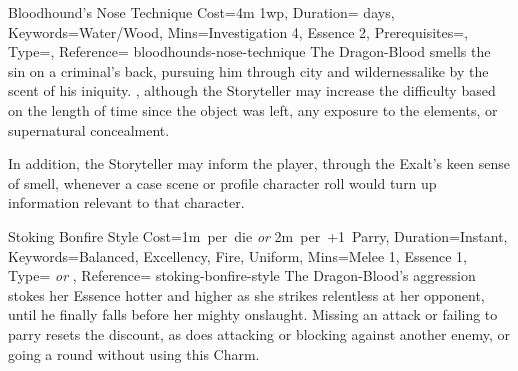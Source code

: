 \begin{Charm}{Bloodhound's Nose Technique}{%
    Cost=4m 1wp,
    Duration={ days},
    Keywords=Water/Wood,
    Mins={Investigation 4, Essence 2},
    Prerequisites=,
    Type=\SimpleType,
    Reference=\cite*[p.~199]{db}
}{bloodhounds-nose-technique}
    The Dragon-Blood smells the sin on a criminal's back, pursuing him through city
    and wildernessalike by the scent of his iniquity. , although the Storyteller may increase the difficulty based on
    the length of time since the object was left, any exposure to the elements, or
    supernatural concealment. 

     In addition, the Storyteller may inform the player,
    through the Exalt's keen sense of smell, whenever a case scene or profile
    character roll would turn up information relevant to that character.
\end{Charm}



\columnbreak
{}

\begin{Charm}{Stoking Bonfire Style}{%
    Cost={1m~per~die \emph{or} 2m~per~+1~Parry},
    Duration=Instant,
    Keywords={Balanced, Excellency, Fire, Uniform},
    Mins={Melee 1, Essence 1},
    Type={\SupplementalType{} \emph{or} \ReflexiveType},
    Reference=\cite*[p.~225]{db}
}{stoking-bonfire-style}
    The Dragon-Blood's aggression stokes her Essence hotter and higher as she
    strikes relentless at her opponent, until he finally falls before her mighty
    onslaught.  Missing an
    attack or failing to parry resets the discount, as does attacking or blocking
    against another enemy, or going a round without using this Charm.
\end{Charm}


